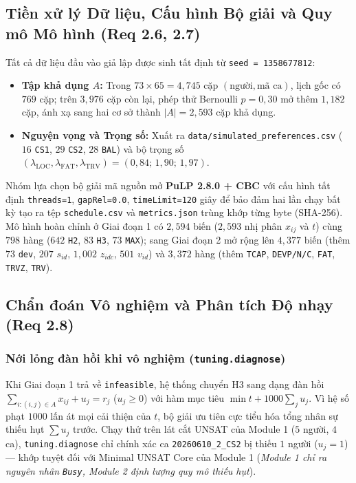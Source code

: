 \subsection{Tiền xử lý Dữ liệu, Cấu hình Bộ giải và Quy mô Mô hình (Req 2.6, 2.7)}
\label{sec:m2_solver}

Tất cả dữ liệu đầu vào giả lập được sinh tất định từ \texttt{seed = 1358677812}:
\begin{itemize}
    \item \textbf{Tập khả dụng $A$:} Trong $73 \times 65 = 4{,}745$ cặp $(\text{người}, \text{mã ca})$, lịch gốc có $769$ cặp; trên $3{,}976$ cặp còn lại, phép thử Bernoulli $p = 0{,}30$ mở thêm $1{,}182$ cặp, ánh xạ sang hai cơ sở thành $|A| = 2{,}593$ cặp khả dụng.
    \item \textbf{Nguyện vọng và Trọng số:} Xuất ra \texttt{data/\allowbreak simulated\_\allowbreak preferences.csv} ($16$ \texttt{CS1}, $29$ \texttt{CS2}, $28$ \texttt{BAL}) và bộ trọng số $(\lambda_{\text{LOC}}, \lambda_{\text{FAT}}, \lambda_{\text{TRV}}) = (0{,}84;\, 1{,}90;\, 1{,}97)$.
\end{itemize}

Nhóm lựa chọn bộ giải mã nguồn mở \textbf{PuLP 2.8.0 + CBC} với cấu hình tất định \texttt{threads=1}, \texttt{gapRel=0.0}, \texttt{timeLimit=120} giây để bảo đảm hai lần chạy bất kỳ tạo ra tệp \texttt{schedule.csv} và \texttt{metrics.json} trùng khớp từng byte (SHA-256). Mô hình hoàn chỉnh ở Giai đoạn 1 có $2{,}594$ biến ($2{,}593$ nhị phân $x_{ij}$ và $t$) cùng $798$ hàng ($642$ \texttt{H2}, $83$ \texttt{H3}, $73$ \texttt{MAX}); sang Giai đoạn 2 mở rộng lên $4{,}377$ biến (thêm $73$ \texttt{dev}, $207$ $s_{id}$, $1{,}002$ $z_{idc}$, $501$ $v_{id}$) và $3{,}372$ hàng (thêm \texttt{TCAP}, \texttt{DEVP/N/C}, \texttt{FAT}, \texttt{TRVZ}, \texttt{TRV}).

\subsection{Chẩn đoán Vô nghiệm và Phân tích Độ nhạy (Req 2.8)}
\label{sec:m2_tuning}

\subsubsection{Nới lỏng đàn hồi khi vô nghiệm (\texttt{tuning.diagnose})}
Khi Giai đoạn 1 trả về \texttt{infeasible}, hệ thống chuyển H3 sang dạng đàn hồi $\sum_{i:(i,j)\in A} x_{ij} + u_j = r_j$ ($u_j \ge 0$) với hàm mục tiêu $\min t + 1000 \sum_j u_j$. Vì hệ số phạt $1000$ lấn át mọi cải thiện của $t$, bộ giải ưu tiên cực tiểu hóa tổng nhân sự thiếu hụt $\sum u_j$ trước. Chạy thử trên lát cắt UNSAT của Module 1 ($5$ người, $4$ ca), \texttt{tuning.diagnose} chỉ chính xác ca \texttt{20260610\_2\_CS2} bị thiếu $1$ người ($u_j = 1$) --- khớp tuyệt đối với Minimal UNSAT Core của Module 1 (\textit{Module 1 chỉ ra nguyên nhân \texttt{Busy}, Module 2 định lượng quy mô thiếu hụt}).

